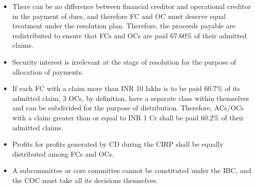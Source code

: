 \documentclass[12pt]{article}
\begin{document}
\begin{itemize}
		\begin{itemize}
			\item There can be no difference between financial creditor and operational creditor in the payment of dues, and therefore FC and OC must deserve equal treatment under the resolution plan. Therefore, the proceeds payable are redistributed to ensure that FCs and OCs are paid 67.60\% of their admitted claims.
			\item Security interest is irrelevant at the stage of resolution for the purpose of allocation of payments.
			\item If each FC with a claim more than INR 10 lakhs is to be paid 60.7\% of its admitted claim, 3 OCs, by definition, have a separate class within themselves and can be subdivided for the purpose of distribution. Therefore, ACs/OCs with a claim greater than or equal to INR 1 Cr shall be paid 60.2\% of their admitted claims.
			\item Profits for profits generated by CD during the CIRP shall be equally distributed among FCs and OCs.
			\item A subcommittee or core committee cannot be constituted under the IBC, and the COC must take all its decisions themselves.
		\end{itemize}
\end{itemize}
\end{document}
